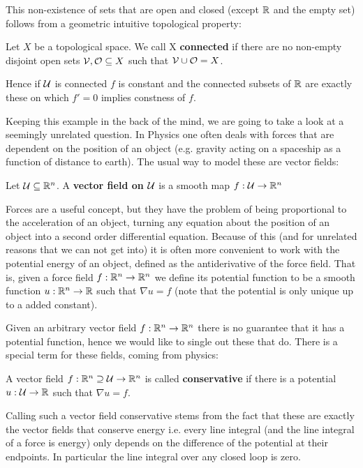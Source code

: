 This non-existence of sets that are open and closed (except $\mathbb{R}$ and the empty set) follows from a
geometric intuitive topological property:
\begin{definition}
	Let $X$ be a topological space. We call X \textbf{connected} if there are no non-empty
	disjoint open sets $\mathcal{V}, \mathcal{O} \subseteq X$ such that $\mathcal{V} \cup \mathcal{O} = X$.
\end{definition}
Hence if $\mathcal{U}$ is connected $f$ is constant and the connected subsets of $\mathbb{R}$ are exactly
these on which $f' = 0$ implies constness of $f$.

Keeping this example in the back of the mind, we are going to take a look at a seemingly unrelated
question. In Physics one often deals with forces that are dependent on the position of an object (e.g. gravity
acting on a spaceship as a function of distance to earth). The usual way to model these are vector fields:
\begin{definition}
Let $\mathcal{U} \subseteq \mathbb{R}^n$. A \textbf{vector field on $\mathcal{U}$} is a smooth map $f: \mathcal{U} \to \mathbb{R}^n$
\end{definition}

Forces are a useful concept, but they have the problem of being proportional to the acceleration
of an object, turning any equation about the position of an object into a second order differential
equation. Because of this (and for unrelated reasons that we can not get into) it is often more convenient
to work with the potential energy of an object, defined as the antiderivative of the force field. That is,
given a  force field $f: \mathbb{R}^n \to \mathbb{R}^n$ we define its potential function to be a smooth function $u: \mathbb{R}^n \to \mathbb{R}$
such that $\nabla u = f$ (note that the potential is only unique up to a added constant).

Given an arbitrary vector field $f: \mathbb{R}^n \to \mathbb{R}^n$ there is no guarantee that it has a potential function, hence we would like to
single out these that do. There is a special term for these fields, coming from physics:
\begin{definition}
A vector field $f: \mathbb{R}^n \supseteq \mathcal{U} \to \mathbb{R}^n$ is called \textbf{conservative} if there is a potential $u: \mathcal{U} \to \mathbb{R}$
such that $\nabla u = f$.
\end{definition}
Calling such a vector field conservative stems from the fact that these are exactly the vector
fields that conserve energy i.e. every line integral (and the line integral of a force is
energy) only depends on the difference of the potential at their endpoints.
In particular the line integral over any closed loop is zero.

